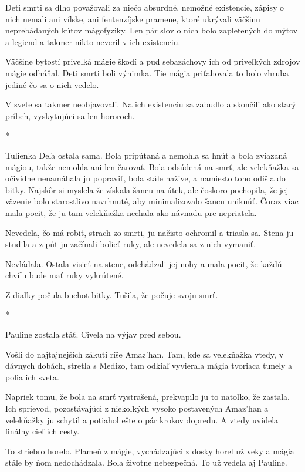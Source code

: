 \documentclass{book}
\begin{document}
Deti smrti sa dlho považovali za niečo absurdné, nemožné existencie, zápisy o nich nemali ani vílske, ani fentenzíjske pramene, ktoré ukrývali väčšinu neprebádaných kútov mágofyziky. Len pár slov o nich bolo zapletených do mýtov a legiend a takmer nikto neveril v ich existenciu.

Väčšine bytostí priveľká mágie škodí a pud sebazáchovy ich od priveľkých zdrojov mágie odháňal. Deti smrti boli výnimka. Tie mágia priťahovala to bolo zhruba jediné čo sa o nich vedelo.

V svete sa takmer neobjavovali. Na ich existenciu sa zabudlo a skončili ako starý príbeh, vyskytujúci sa len hororoch.

\begin{center}
*
\end{center}

Tulienka Deľa ostala sama. Bola pripútaná a nemohla sa hnúť a bola zviazaná mágiou, takže nemohla ani len čarovať. Bola odsúdená na smrť, ale velekňažka sa očividne nenamáhala ju popraviť, bola stále nažive, a namiesto toho odišla do bitky. Najskôr si myslela že získala šancu na útek, ale čoskoro pochopila, že jej väzenie bolo starostlivo navrhnuté, aby minimalizovalo šancu uniknúť. Čoraz viac mala pocit, že ju tam velekňažka nechala ako návnadu pre nepriateľa.

Nevedela, čo má robiť, strach zo smrti, ju načisto ochromil a triasla sa. Stena ju studila a z pút ju začínali bolieť ruky, ale nevedela sa z nich vymaniť.

Nevládala. Ostala visieť na stene, odchádzali jej nohy a mala pocit, že každú chvíľu bude mať ruky vykrútené.

Z diaľky počula buchot bitky. Tušila, že počuje svoju smrť.

\begin{center}
*
\end{center}

Pauline zostala stáť. Civela na výjav pred sebou.

Vošli do najtajnejších zákutí ríše Amaz'han. Tam, kde sa velekňažka vtedy, v dávnych dobách, stretla s Medizo, tam odkiaľ vyvierala mágia tvoriaca tunely a polia ich sveta.

Napriek tomu, že bola na smrť vystrašená, prekvapilo ju to natoľko, že zastala. Ich sprievod, pozostávajúci z niekoľkých vysoko postavených Amaz'han a velekňažky ju schytil a potiahol ešte o pár krokov dopredu. A vtedy uvidela finálny cieľ ich cesty.

To striebro horelo. Plameň z mágie, vychádzajúci z dosky horel už veky a mágia stále by ňom nedochádzala. Bola životne nebezpečná. To už vedela aj Pauline.
\end{document}
